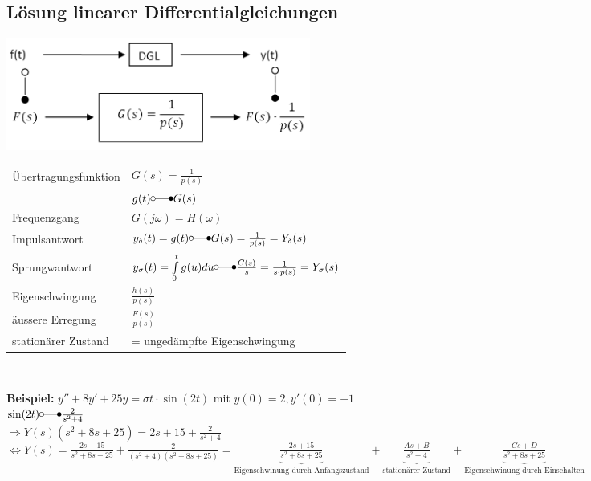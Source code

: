 	\subsection{Lösung linearer Differentialgleichungen}
		\includegraphics[width=10cm]{./bilder/diffgleichungen2.png}
		
		\renewcommand{\arraystretch}{2}
		\begin{tabular}{| l | l |}
			\hline
				Übertragungsfunktion & $G(s) = \frac{1}{p(s)}$\\
				& $g(t) \laplace G(s)$ \\
			\hline
				Frequenzgang & $G(j\omega) = H(\omega)$ \\
			\hline
				Impulsantwort & $y_{\delta}(t) = g(t) \laplace G(s) = \frac{1}{p(s)}=Y_{\delta}(s)$\\
			\hline
				Sprungwantwort & $y_{\sigma}(t)=\int\limits_0^t g(u) du \laplace \frac{G(s)}{s} = \frac{1}{s \cdot p(s)} = Y_{\sigma}(s)$\\
			\hline
				Eigenschwingung & $\frac{h(s)}{p(s)}$ \\
			\hline
				äussere Erregung & $\frac{F(s)}{p(s)}$ \\
			\hline
				stationärer Zustand & = ungedämpfte Eigenschwingung\\
			\hline
		\end{tabular}
		\renewcommand{\arraystretch}{\arraystretchOriginal}\\
		
		\begin{minipage}[l]{16cm}
				\textbf{Beispiel:} $y'' + 8y' + 25y = \sigma{t} \cdot \sin(2t)$ mit $y(0) = 2, y'(0) = -1$\\
				
				$\sin(2t) \laplace \frac{2}{s^2+4}$ \\
				
				$\Rightarrow Y(s)(s^2+8s+25) = 2s+15+\frac{2}{s^2+4}$\\
				
				$\Leftrightarrow Y(s) = \frac{2s+15}{s^2+8s+25}+\frac{2}{(s^2+4)(s^2+8s+25)}=
				\underbrace{\frac{2s+15}{s^2+8s+25}}_\text{Eigenschwinung durch Anfangszustand} +
				\underbrace{\frac{As + B}{s^2+4}}_\text{stationärer Zustand} +
				\underbrace{\frac{Cs + D}{s^2+8s+25}}_\text{Eigenschwinung durch Einschalten}$
		\end{minipage}

